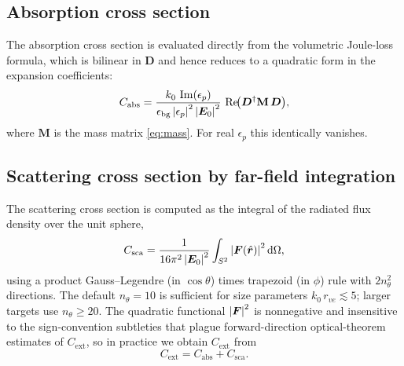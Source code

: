 \documentclass[11pt,a4paper]{article}
\begin{document}
\subsection{Absorption cross section}
\label{sec:C-abs}

The absorption cross section is evaluated directly from the volumetric
Joule-loss formula, which is bilinear in $\bm{D}$ and hence reduces to
a quadratic form in the expansion coefficients:
\begin{equation}
  C_{\text{abs}}
    = \frac{k_0\,\Im(\epsilon_p)}
           {\epsilon_{\text{bg}}\,\abs{\epsilon_p}^{2}\,\abs{\bm{E}_0}^{2}}\,
      \Re\!\bigl(\bm{D}^{\dagger}\mathbf{M}\,\bm{D}\bigr),
  \label{eq:C-abs}
\end{equation}
where $\mathbf{M}$ is the mass matrix \eqref{eq:mass}. For real
$\epsilon_p$ this identically vanishes.

\subsection{Scattering cross section by far-field integration}
\label{sec:C-sca}

The scattering cross section is computed as the integral of the
radiated flux density over the unit sphere,
\begin{equation}
  C_{\text{sca}}
    = \frac{1}{16\pi^{2}\,\abs{\bm{E}_0}^{2}}
      \int_{S^{2}} \abs{\bm{F}(\hat{\bm{r}})}^{2}\,\dd\Omega,
  \label{eq:C-sca}
\end{equation}
using a product Gauss--Legendre (in $\cos\theta$) times trapezoid (in
$\phi$) rule with $2 n_{\theta}^{2}$ directions. The default
$n_{\theta} = 10$ is sufficient for size parameters
$k_0\,r_{ve}\lesssim 5$; larger targets use $n_\theta\ge 20$. The
quadratic functional $\abs{\bm{F}}^{2}$ is nonnegative and insensitive
to the sign-convention subtleties that plague forward-direction
optical-theorem estimates of $C_{\text{ext}}$, so in practice we obtain
$C_{\text{ext}}$ from
\begin{equation}
  C_{\text{ext}} = C_{\text{abs}} + C_{\text{sca}}.
  \label{eq:C-ext}
\end{equation}

\end{document}
